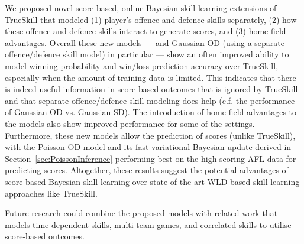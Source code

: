 We proposed novel score-based, online Bayesian skill learning extensions of
TrueSkill that modeled (1) player's offence and defence skills
separately, (2) how these offence and defence skills
interact to generate scores, and (3) home field advantages.  Overall these new models --- and
Gaussian-OD (using a separate offence/defence skill model) in particular ---
show an often improved ability to model winning probability and
win/loss prediction accuracy over TrueSkill, especially when the
amount of training data is limited. This indicates that there is
indeed useful information in score-based outcomes that is ignored by
TrueSkill and that separate offence/defence skill modeling does help
(c.f. the performance of Gaussian-OD vs. Gaussian-SD). The introduction of home field advantages to the models also show improved performance for some of the settings. Furthermore, these new models allow the prediction of scores (unlike TrueSkill),
with the Poisson-OD model and its fast variational Bayesian update derived
in Section~\ref{sec:PoissonInference} performing best on the
high-scoring AFL data for predicting scores. Altogether, these results suggest the
potential advantages of score-based Bayesian skill learning over
state-of-the-art WLD-based skill learning approaches like TrueSkill.

Future research could combine the proposed models with related work that models time-dependent skills, multi-team games, and correlated skills to utilise score-based outcomes.